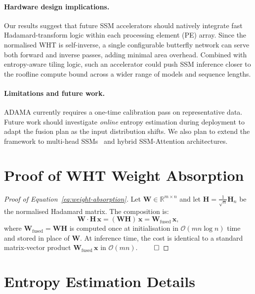 \documentclass{article}
\newcommand{\mH}{\mathbf{H}}          %
\newcommand{\mW}{\mathbf{W}}          %
\newcommand{\vx}{\mathbf{x}}          %
\newcommand{\RR}{\mathbb{R}}
\begin{document}
\paragraph{Hardware design implications.}
Our results suggest that future SSM accelerators should natively integrate
fast Hadamard-transform logic within each processing element (PE) array.
Since the normalised WHT is self-inverse, a single configurable butterfly
network can serve both forward and inverse passes, adding minimal area
overhead.  Combined with entropy-aware tiling logic, such an accelerator
could push SSM inference closer to the roofline compute bound across a wider
range of models and sequence lengths.

\paragraph{Limitations and future work.}
ADAMA currently requires a one-time calibration pass on representative data.
Future work should investigate \emph{online} entropy estimation during
deployment to adapt the fusion plan as the input distribution shifts.
We also plan to extend the framework to multi-head SSMs~\citep{dao2024mamba2}
and hybrid SSM-Attention architectures.




\appendix

\section{Proof of WHT Weight Absorption}
\label{app:proof}

\begin{proof}[Proof of Equation~\eqref{eq:weight-absorption}]
Let $\mW \in \RR^{m \times n}$ and let $\mH = \frac{1}{\sqrt{n}}\mH_n$ be the
normalised Hadamard matrix.  The composition is:
\[
  \mW \cdot \mH \, \vx = (\mW \mH) \, \vx = \mW_{\mathrm{fused}} \, \vx,
\]
where $\mW_{\mathrm{fused}} = \mW \mH$ is computed once at initialisation in
$\mathcal{O}(mn \log n)$ time and stored in place of $\mW$.  At inference
time, the cost is identical to a standard matrix-vector product
$\mW_{\mathrm{fused}} \, \vx$ in $\mathcal{O}(mn)$.  $\qed$
\end{proof}

\section{Entropy Estimation Details}
\label{app:entropy}
\end{document}
